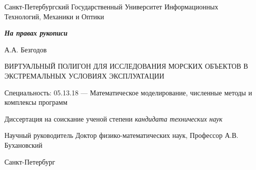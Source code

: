 \begin{titlepage}
\begin{center}

Санкт-Петербургский Государственный Университет Информационных Технологий, Механики и Оптики

\begin{flushright}
\textit{\textbf{На правах рукописи}}
\end{flushright}

\vspace*{0.5in}

\vspace{1.0in}
{\large А.А. Безгодов}
\vspace{0.25in}

{\large ВИРТУАЛЬНЫЙ ПОЛИГОН ДЛЯ ИССЛЕДОВАНИЯ МОРСКИХ ОБЪЕКТОВ В ЭКСТРЕМАЛЬНЫХ УСЛОВИЯХ ЭКСПЛУАТАЦИИ}
\vspace{0.5in}

Специальность: 05.13.18 --- Математическое моделирование, численные методы и комплексы программ
\vspace{0.25in}

Диссертация на соискание ученой степени  \linebreak
\textsl{кандидата технических наук}
\vspace{0.5in}

\begin{flushright}
Научный руководитель \linebreak
Доктор физико-математических наук, \linebreak
Профессор А.В. Бухановский \linebreak
\end{flushright}

\vspace{1.0in}
Санкт-Петербург  



\end{center}
\end{titlepage}

